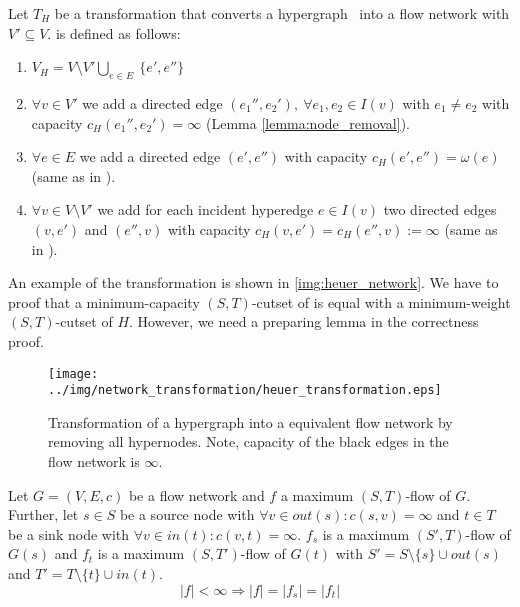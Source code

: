 \begin{definition}
Let $T_H$ be a transformation that converts a hypergraph \HypergraphDef~into 
a flow network  with $V' \subseteq V$.  is defined as follows:
\begin{enumerate}
\item $V_H = V\setminus V' \bigcup\limits_{e \in E}\ \{e', e''\}$
\item $\forall v \in V'$ we add a directed edge $(e_1'', e_2'),\ \forall e_1, e_2 \in I(v)$ 
      with $e_1 \neq e_2$ with capacity $c_H(e_1'', e_2') = \infty$ (Lemma \ref{lemma:node_removal}).
\item $\forall e \in E$ we add a directed edge $(e',e'')$
      with capacity $c_H(e',e'') = \omega(e)$ (same as in ).
\item $\forall v \in V\setminus V'$ we add for each incident hyperedge $e \in I(v)$ two directed
      edges $(v,e')$ and $(e'',v)$ with capacity 
      $c_H(v,e') = c_H(e'',v) := \infty$ (same as in ).
\end{enumerate} 
\end{definition}

An example of the transformation is shown in \autoref{img:heuer_network}.
We have to proof that a minimum-capacity $(S,T)$-cutset
of  is equal with a minimum-weight $(S,T)$-cutset of $H$. However,
we need a preparing lemma in the correctness proof.

\begin{figure}
\centering
\texttt{[image: ../img/network\_transformation/heuer\_transformation.eps]}
\caption{Transformation of a hypergraph into a equivalent flow network by removing
         all hypernodes. Note, capacity of the black edges in the flow network is $\infty$.}
\label{img:heuer_network}
\end{figure}

\begin{lemma}
\label{lemma:source_and_sink_removal}
Let $G = (V,E,c)$ be a flow network and $f$ a maximum $(S,T)$-flow of $G$.
Further, let $s \in S$ be a source node with $\forall v \in out(s): c(s,v) = \infty$
and $t \in T$ be a sink node with $\forall v \in in(t): c(v,t) = \infty$.
$f_s$ is a maximum $(S',T)$-flow of $G(s)$ and $f_t$ is a maximum $(S,T')$-flow
of $G(t)$ with $S' = S\setminus \{s\} \cup out(s)$ and $T' = T \setminus \{t\}
\cup in(t)$.
\[|f| < \infty \Rightarrow |f| = |f_s| = |f_t|\]
\end{lemma}

